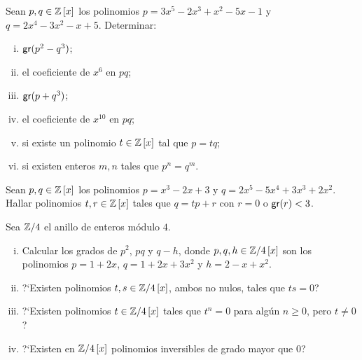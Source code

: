 \begin{ejerPolinomios}\label{ejer:polinomios:grado}
	Sean $p,q\in\polinomios[x]\Enteros$ los polinomios
	$p=3x^5-2x^3+x^2-5x-1$ y $q=2x^4-3x^2-x+5$. Determinar:
	\begin{enumerate}[(i)]
		\item\label{item:ejer:polinomios:grado:i}
			$\grado(p^2-q^3)$;
		\item\label{item:ejer:polinomios:grado:ii}
			el coeficiente de $x^6$ en $pq$;
		\item\label{item:ejer:polinomios:grado:iii}
			$\grado(p+q^3)$;
		\item\label{item:ejer:polinomios:grado:iv}
			el coeficiente de $x^{10}$ en $pq$;
		\item\label{item:ejer:polinomios:grado:v}
			si existe un polinomio $t\in\polinomios[x]\Enteros$
			tal que $p=tq$;
		\item\label{item:ejer:polinomios:grado:vi}
			si existen enteros $m,n$ tales que $p^n=q^m$.
	\end{enumerate}
\end{ejerPolinomios}

\begin{ejerPolinomios}
	Sean $p,q\in\polinomios[x]\Enteros$ los polinomios
	$p=x^3-2x+3$ y $q=2x^5-5x^4+3x^3+2x^2$. Hallar polinomios
	$t,r\in\polinomios[x]\Enteros$ tales que $q=tp+r$ con $r=0$ o
	$\grado(r)<3$.
\end{ejerPolinomios}

\begin{ejerPolinomios}\label{ejer:polinomios:grado:bis}
	Sea $\simEnterosmod[4]$ el anillo de enteros m\'odulo $4$.
	\begin{enumerate}[(i)]
		\item\label{item:ejer:polinomios:grado:bis:i}
			Calcular los grados de $p^2$, $pq$ y $q-h$,
			donde $p,q,h\in\polinomios[x]{\simEnterosmod[4]}$ son
			los polinomios $p=1+2x$, $q=1+2x+3x^2$ y $h=2-x+x^2$.
		\item\label{item:ejer:polinomios:grado:bis:i}
			?`Existen polinomios
			$t,s\in\polinomios[x]{\simEnterosmod[4]}$, ambos
			no nulos, tales que $ts=0$?
		\item\label{item:ejer:polinomios:grado:bis:i}
			?`Existen polinomios
			$t\in\polinomios[x]{\simEnterosmod[4]}$ tales que
			$t^n=0$ para alg\'un $n\geq 0$, pero $t\neq 0$?
		\item\label{item:ejer:polinomios:grado:bis:i}
			?`Existen en $\polinomios[x]{\simEnterosmod[4]}$
			polinomios inversibles de grado mayor que $0$?
	\end{enumerate}
\end{ejerPolinomios}


